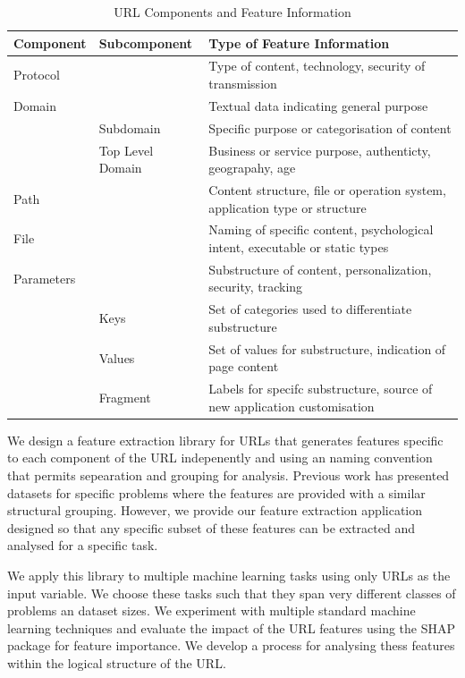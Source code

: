 \documentclass[sigconf]{acmart}
\begin{document}
\begin{table}
\caption{URL Components and Feature Information}
\label{tab:components}
\begin{tabular}{|l|l|l|}
\toprule
Component    &Subcomponent      &Type of Feature Information       \\
\midrule
Protocol     &                  &Type of content, technology, security of transmission             \\
\midrule
Domain       &                  &Textual data indicating general purpose      \\
             &Subdomain         &Specific purpose or categorisation of content           \\
             &Top Level Domain  &Business or service purpose, authenticty, geograpahy, age           \\
\midrule
Path         &                  &Content structure, file or operation system, application type or structure         \\
\midrule
File         &                  &Naming of specific content, psychological intent, executable or static types      \\
\midrule
Parameters   &                  &Substructure of content, personalization, security, tracking         \\
             &Keys              &Set of categories used to differentiate substructure        \\
             &Values            &Set of values for substructure, indication of page content        \\
             &Fragment          &Labels for specifc substructure, source of new application customisation        \\
\bottomrule
\end{tabular}
\end{table}

We design a feature extraction library for URLs that generates features specific to each component of the
URL indepenently and using an naming convention that permits sepearation and grouping for analysis.
Previous work has presented datasets for specific problems where the features
are provided with a similar structural grouping\cite{Vrban2020}. However, we provide our feature extraction
application designed so that any specific subset of these features can be extracted and analysed 
for a specific task.

We apply this library to multiple machine learning tasks using only URLs as the input variable. We choose
these tasks such that they span very different classes of problems an dataset sizes. 
We experiment with multiple standard machine learning techniques and evaluate
the impact of the URL features using the SHAP package for feature importance. We develop a process
for analysing thess features within the logical structure of the URL.
\end{document}
